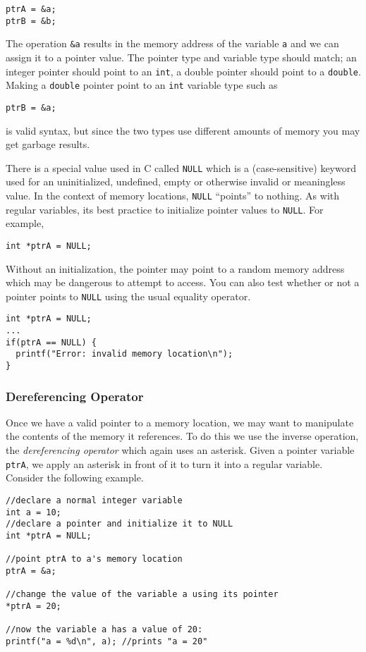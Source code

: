 \begin{verbatim}
ptrA = &a;
ptrB = &b;
\end{verbatim}

The operation \texttt{&a} results in the memory address of the
variable \texttt{a} and we can assign it to a pointer value.
The pointer type and variable type should match; an integer pointer
should point to an \texttt{int}, a double pointer should point 
to a \texttt{double}.
Making a \texttt{double} pointer point to an \texttt{int}
variable type such as

\texttt{ptrB = &a;}

is valid syntax, but since the two types use different amounts of memory
you may get garbage results.

There is a special value used in C called \texttt{NULL} which
is a (case-sensitive) keyword used for an uninitialized, undefined, empty or otherwise
invalid or meaningless value.  In the context of memory locations, 
\texttt{NULL} ``points'' to nothing.  As with regular variables,
its best practice to initialize pointer values to \texttt{NULL}.
For example, 

\texttt{int *ptrA = NULL;}

Without an initialization, the pointer may point to a random memory
address which may be dangerous to attempt to access.  You can also
test whether or not a pointer points to \texttt{NULL} using the 
usual equality operator.

\begin{verbatim}
int *ptrA = NULL;
...
if(ptrA == NULL) {
  printf("Error: invalid memory location\n");
}
\end{verbatim}

\subsubsection{Dereferencing Operator}

Once we have a valid pointer to a memory location, we may want
to manipulate the contents of the memory it references.  To do this
we use the inverse operation, the \emph{dereferencing operator}
which again uses an asterisk.  Given a pointer variable \texttt{ptrA}, 
we apply an asterisk in front of it to turn it into a regular variable.
Consider the following example.

\begin{verbatim}
//declare a normal integer variable
int a = 10;
//declare a pointer and initialize it to NULL
int *ptrA = NULL;

//point ptrA to a's memory location
ptrA = &a;

//change the value of the variable a using its pointer
*ptrA = 20;

//now the variable a has a value of 20:
printf("a = %d\n", a); //prints "a = 20"
\end{verbatim}

